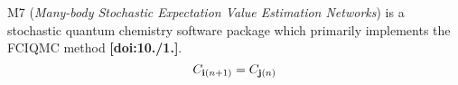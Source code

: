 M7 ({\itshape Many-\/body Stochastic Expectation Value Estimation Networks}) is a stochastic quantum chemistry software package which primarily implements the F\+C\+I\+Q\+MC method {\bfseries [doi\+:10./1.]}. \[ C_{\mathbf{i}(n+1)} = C_{\mathbf{j}(n)} \] 
